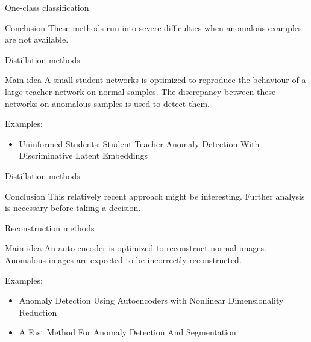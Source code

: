 \documentclass[xcolor=pdftex,dvipsnames,table,mathserif]{beamer}
\begin{document}
\begin{frame}{One-class classification}

\begin{block}{Conclusion}
  These methods run into severe difficulties when anomalous examples are not available.
\end{block}

\end{frame}


\begin{frame}{Distillation methods}

\begin{block}{Main idea}
A small student networks is optimized to reproduce the behaviour of a large teacher network on normal samples. The discrepancy between these networks on anomalous samples is used to detect them.
\end{block}

Examples:
\begin{itemize}
\item Uninformed Students: Student-Teacher Anomaly Detection With Discriminative Latent Embeddings \cite{bergmann_uninformed_2020}
\end{itemize}

\end{frame}


\begin{frame}{Distillation methods}

  \begin{block}{Conclusion}
    This relatively recent approach might be interesting. Further analysis is necessary before taking a decision.
  \end{block}
\end{frame}


\begin{frame}{Reconstruction methods}

\begin{block}{Main idea}
An auto-encoder is optimized to reconstruct normal images. Anomalous images are expected to be incorrectly reconstructed.
\end{block}

Examples:
\begin{itemize}
\item Anomaly Detection Using Autoencoders with Nonlinear Dimensionality Reduction\cite{sakurada_anomaly_2014}
\item A Fast Method For Anomaly Detection And Segmentation \cite{ndiour_fre_2022}
\end{itemize}

\end{frame}
\end{document}
